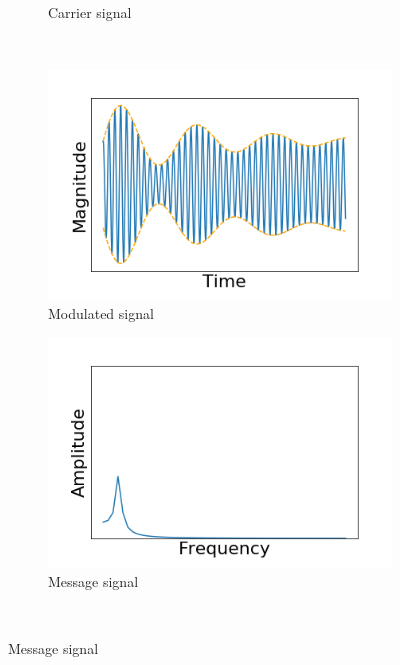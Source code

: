 \documentclass[]{article}
\begin{document}
\begin{figure}[h!]
\begin{subfigure}[b]{0.3\textwidth}
		\caption{Carrier signal}
		\label{fig:am_carrier_signal}
	\end{subfigure}
	~ %
	\begin{subfigure}[b]{0.3\textwidth}
		\includegraphics[width=\textwidth]{figs/amplitude_modulation/am/modulated_signal.png}
		\caption{Modulated signal}
		\label{fig:am_modulated_signal}
	\end{subfigure}
	\begin{subfigure}[b]{0.3\textwidth}
		\includegraphics[width=\textwidth]{figs/amplitude_modulation/am/message_signal_freq.png}
		\caption{Message signal}
		\label{fig:am_message_signal_freq}
	\end{subfigure}
	~ %

\end{figure}
\end{document}
